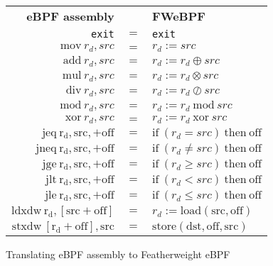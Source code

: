 \begin{figure}[H]
  \centering
  \begin{tabular}{rcl}
    \textbf{eBPF assembly} & & \textbf{FWeBPF} \\
    \texttt{exit} & $=$ & \texttt{exit} \\
    $\mathrm{mov} ~ r_d, src$ & $=$ & $r_d := src$ \\
    $\mathrm{add} ~ r_d, src$ & $=$ & $r_d := r_d \oplus src$ \\
    $\mathrm{mul} ~ r_d, src$ & $=$ & $r_d := r_d \otimes src$ \\        
    $\mathrm{div} ~ r_d, src$ & $=$ & $r_d := r_d \oslash src$ \\
    $\mathrm{mod} ~ r_d, src$ & $=$ & $r_d := r_d ~ \mathrm{mod} ~ src$ \\
    $\mathrm{xor} ~ r_d, src$ & $=$ & $r_d := r_d ~ \mathrm{xor} ~ src$ \\            
    $\mathrm{jeq ~ r_d, src, +off}$ & $=$ & $\mathrm{if} ~ (r_d = src) ~ \mathrm{then} ~ \mathrm{off}$ \\
    $\mathrm{jneq ~ r_d, src, +off}$ & $=$ & $\mathrm{if} ~ (r_d \neq src) ~ \mathrm{then} ~ \mathrm{off}$ \\
    $\mathrm{jge ~ r_d, src, +off}$ & $=$ & $\mathrm{if} ~ (r_d \geq src) ~ \mathrm{then} ~ \mathrm{off}$    \\
    $\mathrm{jlt ~ r_d, src, +off}$ & $=$ & $\mathrm{if} ~ (r_d < src) ~ \mathrm{then} ~ \mathrm{off}$    \\
    $\mathrm{jle ~ r_d, src, +off}$ & $=$ & $\mathrm{if} ~ (r_d \leq src) ~ \mathrm{then} ~ \mathrm{off}$    \\    
    $\mathrm{ldxdw ~ r_d, [src + \mathrm{off}]}$ & $=$ & $r_d := \mathrm{load(src, off)}$ \\
    $\mathrm{stxdw ~ [r_d + off], src}$ & $=$ & $\mathrm{store(dst, off, src)}$ \\    
  \end{tabular}
  \caption{Translating eBPF assembly to Featherweight eBPF}
\label{fig:translation}
\end{figure}

